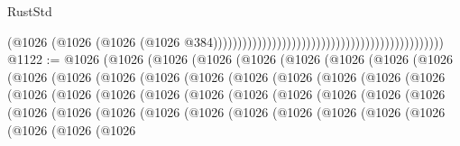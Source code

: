 \begin{lexlean}{RustStd}
\begin{coremodule}
                                                                                          (@1026
                                                                                            (@1026
                                                                                              (@1026
                                                                                                (@1026
                                                                                                  @384)))))))))))))))))))))))))))))))))))))))))))))))
@1122 := @1026
    (@1026
      (@1026
        (@1026
          (@1026
            (@1026
              (@1026
                (@1026
                  (@1026
                    (@1026
                      (@1026
                        (@1026
                          (@1026
                            (@1026
                              (@1026
                                (@1026
                                  (@1026
                                    (@1026
                                      (@1026
                                        (@1026
                                          (@1026
                                            (@1026
                                              (@1026
                                                (@1026
                                                  (@1026
                                                    (@1026
                                                      (@1026
                                                        (@1026
                                                          (@1026
                                                            (@1026
                                                              (@1026
                                                                (@1026
                                                                  (@1026
                                                                    (@1026
                                                                      (@1026
                                                                        (@1026
                                                                          (@1026
                                                                            (@1026
                                                                              (@1026
                                                                                (@1026
                                                                                  (@1026
                                                                                    (@1026

\end{coremodule}
\end{lexlean}

